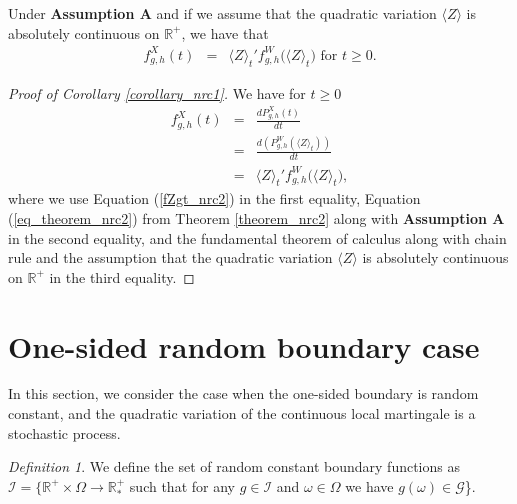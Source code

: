 \documentclass[aop]{imsart}
\theoremstyle{plain}
\theoremstyle{remark}
\newtheorem{definition}[theorem]{Definition}
\newcommand{\reels}{\mathbb{R}}
\begin{document}
\begin{corollary}
\label{corollary_nrc2}
Under \textbf{Assumption A} and if we assume that the quadratic variation $\langle Z\rangle$ is absolutely continuous on $\reels^+$, we have that
\begin{eqnarray}
\label{eq_corollary_nrc2}
f_{g,h}^X (t) & = & \langle Z\rangle_t ' f_{g,h}^W \big(\langle Z\rangle_t\big) \text{ for } t \geq 0.
\end{eqnarray}
\end{corollary}
\begin{proof}[Proof of Corollary \ref{corollary_nrc1}]
We have for $t \geq 0$
\begin{eqnarray*}
f_{g,h}^X (t) & = & \frac{dP_{g,h}^X(t)}{dt}\\
& = & \frac{d(P_{g,h}^W(\langle Z\rangle_t))}{dt}\\
& = & \langle Z\rangle_t ' f_{g,h}^W \big(\langle Z\rangle_t\big),
\end{eqnarray*}
where we use Equation (\ref{fZgt_nrc2}) in the first equality, Equation (\ref{eq_theorem_nrc2}) from Theorem \ref{theorem_nrc2} along with \textbf{Assumption A} in the second equality, and the fundamental theorem of calculus along with chain rule  and the assumption that the quadratic variation $\langle Z\rangle$ is absolutely continuous on $\reels^+$ in the third equality.
\end{proof}

\section{One-sided random boundary case}
In this section, we consider the case when the one-sided boundary is random constant, and the quadratic variation of the continuous local martingale is a stochastic process.

\begin{definition}\label{defboundaryset_rc1}
We define the set of random constant boundary functions as $\mathcal{I} = \big\{ \reels^+ \times \Omega \rightarrow \reels_*^+$ such that for any $g \in \mathcal{I}$ and $\omega \in \Omega$ we have $g(\omega) \in \mathcal{G}$\big\}.
\end{definition}
 
\end{document}
